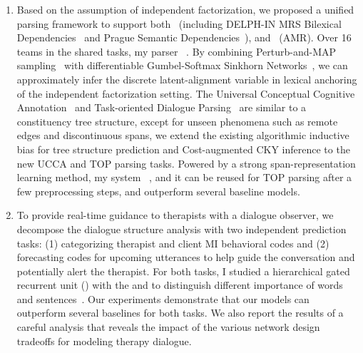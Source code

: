 \begin{enumerate}
\item Based on the assumption of independent factorization, we
  proposed a unified parsing framework to support
  both~ (including DELPH-IN MRS
  Bilexical Dependencies~\citep[DM,][]{Iva:Oep:Ovr:12} and Prague
  Semantic
  Dependencies~\citep[PSD,][]{hajic2012announcing,miyao2014house}),
  and ~(AMR). Over 16 teams in the
  shared tasks, my parser~\citep{cao2019amazon} . By combining Perturb-and-MAP
  sampling~\citep{papandreouperturb} with differentiable
  Gumbel-Softmax Sinkhorn Networks~\citep{mena2018learning}, we can
  approximately infer the discrete latent-alignment variable in
  lexical anchoring of the independent factorization setting. The
   Universal Conceptual Cognitive
  Annotation~\citep[UCCA,][]{Abe:Rap:13b} and Task-oriented
  Dialogue Parsing~\citep[TOP,][]{gupta-etal-2018-semantic-parsing} are
  similar to a constituency tree structure, except for unseen phenomena
  such as remote edges and discontinuous spans, we extend the existing
  algorithmic inductive bias for tree structure prediction and
  Cost-augmented CKY inference to the new UCCA and TOP parsing
  tasks. Powered by a strong span-representation learning method, my
  system~\citep{cao2019amazon} , and
  it can be reused for TOP parsing after a few preprocessing steps,
  and outperform several baseline models.

\item To provide real-time guidance to therapists with a dialogue
  observer, we decompose the dialogue structure analysis with two
  independent prediction tasks: (1) categorizing therapist and client
  MI behavioral codes and (2) forecasting codes for upcoming
  utterances to help guide the conversation and potentially alert the
  therapist. For both tasks, I studied a hierarchical gated recurrent
  unit (\HGRU) with the  and
   to distinguish different importance of
  words and sentences~\citep{jie2019psycdialacl}. Our experiments
  demonstrate that our models can outperform several baselines for
  both tasks. We also report the results of a careful analysis that
  reveals the impact of the various network design tradeoffs for
  modeling therapy dialogue.


\end{enumerate}
